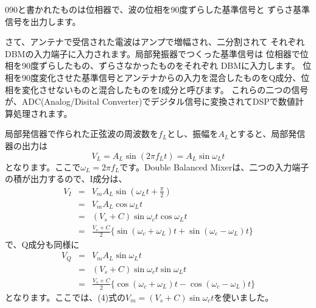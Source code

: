 090と書かれたものは位相器で、波の位相を90度ずらした基準信号と
ずらさ基準信号を出力します。

さて、アンテナで受信された電波はアンプで増幅され、二分割されて
それぞれDBMの入力端子に入力されます。局部発振器でつくった基準信号は
位相器で位相を90度ずらしたもの、ずらさなかったものをそれぞれ
DBMに入力します。
位相を90度変化させた基準信号とアンテナからの入力を混合したものをQ成分、位相を変化させないものと混合したものをI成分と呼びます。
これらの二つの信号が、ADC(Analog/Disital Converter)でデジタル信号に変換されてDSPで数値計算処理されます。

局部発信器で作られた正弦波の周波数を$f_L$とし、振幅を$A_L$とすると、局部発信器の出力は
\begin{equation}
V_L = A_L \sin(2 \pi f_L t) = A_L \sin\omega_Lt
\end{equation}
となります。ここで$\omega_L = 2\pi f_L$です。Double Balanced Mixerは、二つの入力端子の積が出力するので、I成分は、
\begin{eqnarray}
V_I &=& V_mA_L\sin(\omega_Lt + \frac{\pi}{2}) \nonumber\\
&=& V_mA_L\cos\omega_Lt \nonumber\\
&=& (V_s + C)\sin\omega_ct\cos\omega_Lt \nonumber\\
&=& \frac{V_s + C}{2}\{\sin(\omega_c + \omega_L)t + \sin(\omega_c - \omega_L)t\} \label{eq:AM_I}
\end{eqnarray}
で、Q成分も同様に
\begin{eqnarray}
V_Q &=& V_mA_L\sin\omega_Lt \nonumber\\
&=& (V_s + C)\sin\omega_ct\sin\omega_Lt \nonumber\\
&=& \frac{V_s + C}{2}\{\cos(\omega_c + \omega_L)t - \cos(\omega_c - \omega_L)t \}\label{eq:AM_Q}
\end{eqnarray}
となります。ここでは、(4)式の$V_m=(V_s+C)\sin\omega_ct$を使いました。


